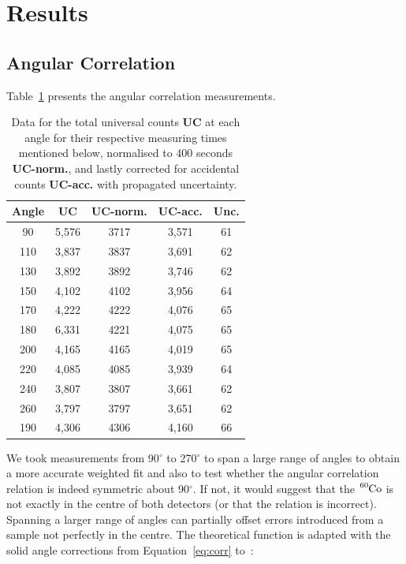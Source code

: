 \documentclass[twocolumn]{article}
\begin{document}
\section{Results}
\subsection{Angular Correlation}
Table~\ref{tab:data} presents the angular correlation measurements. 
\begin{table}[htbp]
	\centering
	\begin{tabular}{c||c|c||c|c}
		\hline
		\textbf{Angle} & \textbf{UC} & \textbf{UC-norm.} & \textbf{UC-acc.} & \textbf{Unc.} \\ \hline \hline
		90    & 5,576 & 3717  & 3,571 & 61 \\ \hline
		110   & 3,837 & 3837  & 3,691 & 62 \\ \hline
		130   & 3,892 & 3892  & 3,746 & 62 \\ \hline
		150   & 4,102 & 4102  & 3,956 & 64 \\ \hline
		170   & 4,222 & 4222  & 4,076 & 65 \\ \hline
		180   & 6,331 & 4221  & 4,075 & 65 \\ \hline
		200   & 4,165 & 4165  & 4,019 & 65 \\ \hline
		220   & 4,085 & 4085  & 3,939 & 64 \\ \hline
		240   & 3,807 & 3807  & 3,661 & 62 \\ \hline
		260   & 3,797 & 3797  & 3,651 & 62 \\ \hline
		190   & 4,306 & 4306  & 4,160 & 66 \\ \hline \hline

	\end{tabular}%
			\caption{Data for the total universal counts \textbf{UC} at each angle for their respective measuring times mentioned below, normalised to 400 seconds \textbf{UC-norm.}, and lastly corrected for accidental counts \textbf{UC-acc.} with propagated uncertainty.} 
	\label{tab:data}%
\end{table}%
We took measurements from 90$^{\circ}$ to 270$^{\circ}$ to span a large range of angles to obtain a more accurate weighted fit and also to test whether the angular correlation relation is indeed symmetric about 90$^{\circ}$. If not, it would suggest that the $\ce{^{60}Co}$ is not exactly in the centre of both detectors (or that the relation is incorrect). Spanning a larger range of angles can partially offset errors introduced from a sample not perfectly in the centre. The theoretical function is adapted with the solid angle corrections from Equation~\ref{eq:corr} to~\cite{sieg}:
\end{document}
